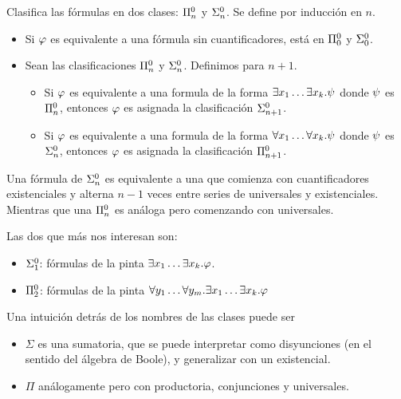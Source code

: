 \begin{definition}
    Clasifica las fórmulas en dos clases: $\Pi^0_{n}$ y
    $\Sigma^0_{n}$. Se define por inducción en $n$.

    \begin{itemize}
        \item Si $\varphi$ es equivalente a una fórmula sin cuantificadores, está en
        $\Pi^0_{0}$ y $\Sigma^0_{0}$.
        \item Sean las clasificaciones $\Pi^0_{n}$ y $\Sigma^0_{n}$. Definimos para $n+1$.
        \begin{itemize}
            \item Si $\varphi$ es equivalente a una formula de la forma $\exists
            x_1 \dots \exists x_k. \psi$ donde $\psi$ es
            $\Pi^0_{n}$, entonces $\varphi$ es asignada la clasificación $\Sigma^0_{n+1}$.
    
            \item Si $\varphi$ es equivalente a una formula de la forma $\forall
            x_1 \dots \forall x_k. \psi$ donde $\psi$ es
            $\Sigma^0_{n}$, entonces $\varphi$ es asignada la clasificación $\Pi^0_{n+1}$.
        \end{itemize}
    \end{itemize}

    Una fórmula de $\Sigma^0_{n}$ es equivalente a una que comienza con
    cuantificadores existenciales y alterna $n-1$ veces entre series de
    universales y existenciales. Mientras que una $\Pi^0_{n}$ es análoga pero
    comenzando con universales.
    
    Las dos que más nos interesan son:
    \begin{itemize}
        \item $\Sigma^0_{1}$: fórmulas de la pinta $\exists x_1 \dots
        \exists x_k . \varphi$.
        \item $\Pi^0_{2}$: fórmulas de la pinta $\forall y_1 \dots \forall y_m . \exists x_1 \dots \exists x_k . \varphi$
    \end{itemize}

    

    Una intuición detrás de los nombres de las clases puede ser
    \begin{itemize}
        \item $\Sigma$ es una sumatoria, que se puede interpretar como
        disyunciones (en el sentido del álgebra de Boole), y generalizar con un existencial.
        \item $\Pi$ análogamente pero con productoria, conjunciones y universales.
    \end{itemize}
\end{definition}

